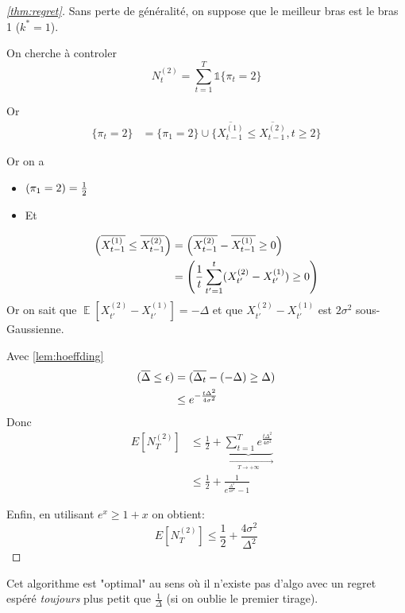 \documentclass{article}
\DeclareMathOperator*{\E}{\mathbb{E}}
\let\P\relax
\DeclareMathOperator*{\P}{\mathbb{P}}
\theoremstyle{remark}
\theoremstyle{remark}
\begin{document}
\begin{proof}[\autoref{thm:regret}]
  Sans perte de généralité, on suppose que le meilleur bras est le bras 1 ($k^* = 1$).

  On cherche à controler
  $$
  N_t^{(2)} = \sum_{t=1}^T \mathbb{1}\{\pi_t = 2\}
  $$

  Or
  \begin{align*}
    \{\pi_t = 2\} &= \{\pi_1 = 2\} \cup \{\overline{X^{(1)}_{t-1}} \leq \overline{X^{(2)}_{t-1}} , t\geq 2\}
  \end{align*}

  Or on a
  \begin{itemize}
    \item $\P(\pi_1=2) = \frac{1}{2}$
    \item Et
  \end{itemize}

  \begin{align*}
    \P\left(\overline{X^{(1)}_{t-1}} \leq \overline{X^{(2)}_{t-1}}\right) &= \P\left(\overline{X^{(2)}_{t-1}} - \overline{X^{(1)}_{t-1}} \geq 0\right) \\
      &= \P\left(\frac{1}{t} \sum_{t'=1}^t (X^{(2)}_{t'} - X^{(1)}_{t'}) \geq 0\right)
  \end{align*}
  Or on sait que $\E[X^{(2)}_{t'} - X^{(1)}_{t'}] = -\Delta$ et que $X^{(2)}_{t'} - X^{(1)}_{t'}$ est $2\sigma^2$ sous-Gaussienne.

  Avec \autoref{lem:hoeffding}
  \begin{align*}
    \P(\overline{\Delta} \leq \epsilon) &= \P(\overline{\Delta_t} - (-\Delta) \geq \Delta) \\
    & \leq e^{-\frac{t \Delta^2}{4 \sigma^2}}
  \end{align*}
  Donc
  \begin{align*}
    E[N^{(2)}_T] &\leq \frac{1}{2} + \underbrace{\sum_{t=1}^T e^{\frac{t \Delta^2}{4\sigma^2}}}_{\xrightarrow[T\rightarrow +\infty]{}} \\
    & \leq \frac{1}{2} + \frac{1}{e^{\frac{\Delta^2}{4\sigma^2}} - 1} &
  \end{align*}

  Enfin, en utilisant $e^x \geq 1+x$ on obtient:
  $$
  E[N^{(2)}_T] \leq \frac{1}{2} + \frac{4\sigma^2}{\Delta^2}
  $$
\end{proof}

Cet algorithme est "optimal" au sens où il n'existe pas d'algo avec un regret espéré \textit{toujours} plus petit que $\frac{1}{\Delta}$ (si on oublie le premier tirage).
\end{document}
